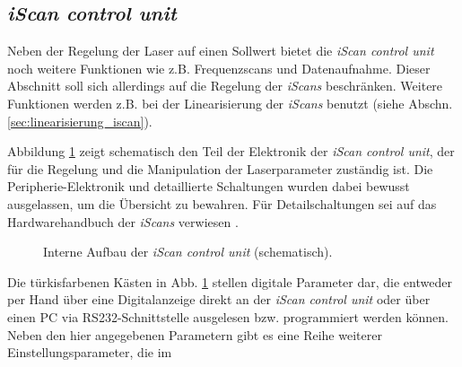 \subsection{\textit{iScan control unit}}\label{subsec:iscan_control_unit}
Neben der Regelung der Laser auf einen Sollwert bietet die \textit{iScan control
unit} noch weitere Funktionen wie z.B. Frequenzscans und Datenaufnahme. Dieser
Abschnitt soll sich allerdings auf die Regelung der \textit{iScans} beschränken.
Weitere Funktionen werden z.B. bei der Linearisierung der \textit{iScans}
benutzt (siehe Abschn.
\ref{sec:linearisierung_iscan}).\par
Abbildung \ref{fig:iscan_control_unit_regelelektronik} zeigt schematisch den
Teil der Elektronik der \textit{iScan control unit}, der für die Regelung und
die Manipulation der Laserparameter zuständig ist. Die Peripherie-Elektronik und
detaillierte Schaltungen wurden dabei bewusst ausgelassen, um die Übersicht zu
bewahren. Für Detailschaltungen sei auf das Hardwarehandbuch der \textit{iScans}
verwiesen \cite{iscan_hardware_guide}.\par
\begin{figure}[h]
 	\centering
	\caption[Interner Aufbau der \textit{iScan control unit},
	schematisch]{Interne Aufbau der \textit{iScan
	control unit} (schematisch).}
	\label{fig:iscan_control_unit_regelelektronik}
\end{figure}
Die türkisfarbenen Kästen in Abb. \ref{fig:iscan_control_unit_regelelektronik}
stellen digitale Parameter dar, die entweder per Hand über eine Digitalanzeige
direkt an der \textit{iScan control unit} oder über einen PC via
RS232-Schnittstelle ausgelesen bzw. programmiert werden können. Neben den hier angegebenen
Parametern gibt es eine Reihe weiterer Einstellungsparameter, die im
